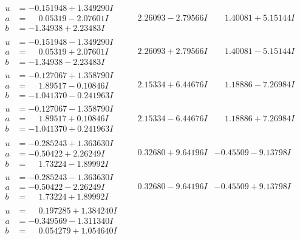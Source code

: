 \documentclass[1p]{elsarticle_modified}
\theoremstyle{definition}
\begin{document}
$$\begin{array}{c|c|c}
\begin{aligned}
u &= -0.151948 + 1.349290 I \\
a &= \phantom{-}0.05319 - 2.07601 I \\
b &= -1.34938 + 2.23483 I\end{aligned}
 & \phantom{-}2.26093 - 2.79566 I & \phantom{-}1.40081 + 5.15144 I \\ \hline\begin{aligned}
u &= -0.151948 - 1.349290 I \\
a &= \phantom{-}0.05319 + 2.07601 I \\
b &= -1.34938 - 2.23483 I\end{aligned}
 & \phantom{-}2.26093 + 2.79566 I & \phantom{-}1.40081 - 5.15144 I \\ \hline\begin{aligned}
u &= -0.127067 + 1.358790 I \\
a &= \phantom{-}1.89517 - 0.10846 I \\
b &= -1.041370 - 0.241963 I\end{aligned}
 & \phantom{-}2.15334 + 6.44676 I & \phantom{-}1.18886 - 7.26984 I \\ \hline\begin{aligned}
u &= -0.127067 - 1.358790 I \\
a &= \phantom{-}1.89517 + 0.10846 I \\
b &= -1.041370 + 0.241963 I\end{aligned}
 & \phantom{-}2.15334 - 6.44676 I & \phantom{-}1.18886 + 7.26984 I \\ \hline\begin{aligned}
u &= -0.285243 + 1.363630 I \\
a &= -0.50422 + 2.26249 I \\
b &= \phantom{-}1.73224 - 1.89992 I\end{aligned}
 & \phantom{-}0.32680 + 9.64196 I & -0.45509 - 9.13798 I \\ \hline\begin{aligned}
u &= -0.285243 - 1.363630 I \\
a &= -0.50422 - 2.26249 I \\
b &= \phantom{-}1.73224 + 1.89992 I\end{aligned}
 & \phantom{-}0.32680 - 9.64196 I & -0.45509 + 9.13798 I \\ \hline\begin{aligned}
u &= \phantom{-}0.197285 + 1.384240 I \\
a &= -0.349569 - 1.311340 I \\
b &= \phantom{-}0.054279 + 1.054640 I\end{aligned}

\end{array}$$
\end{document}
